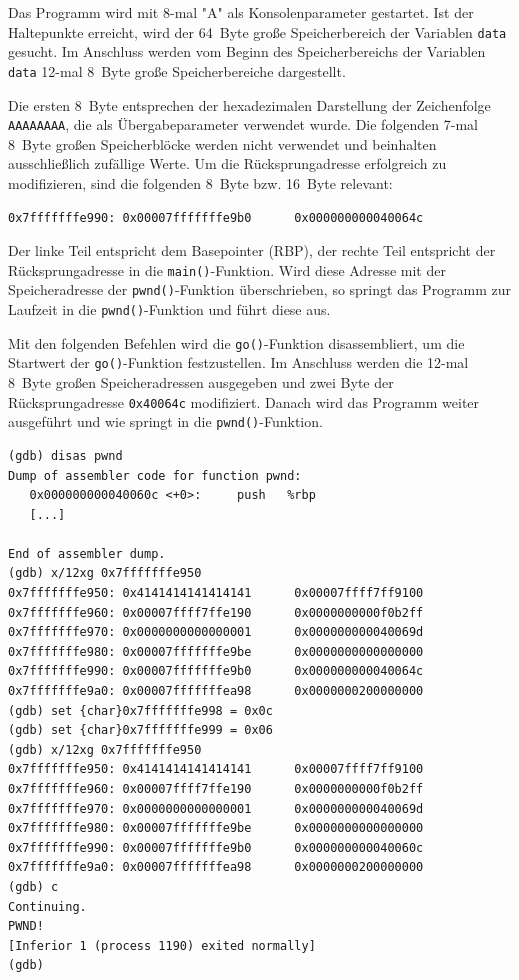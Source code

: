 Das Programm wird mit 8-mal "A" als Konsolenparameter gestartet. Ist der Haltepunkte erreicht, wird der \SI{64}{Byte} große Speicherbereich der Variablen \texttt{data} gesucht. Im Anschluss werden vom Beginn des Speicherbereichs der Variablen \texttt{data} 12-mal \SI{8}{Byte} große Speicherbereiche dargestellt. 

Die ersten \SI{8}{Byte} entsprechen der hexadezimalen Darstellung der Zeichenfolge \texttt{AAAAAAAA}, die als Übergabeparameter verwendet wurde. Die folgenden 7-mal \SI{8}{Byte} großen Speicherblöcke werden nicht verwendet und beinhalten ausschließlich zufällige Werte. Um die Rücksprungadresse erfolgreich zu modifizieren, sind die folgenden \SI{8}{Byte} bzw. \SI{16}{Byte} relevant:

\begin{lstlisting}[basicstyle=\ttfamily\footnotesize]
0x7fffffffe990: 0x00007fffffffe9b0      0x000000000040064c
\end{lstlisting}

Der linke Teil entspricht dem Basepointer (RBP), der rechte Teil entspricht der Rücksprungadresse in die \texttt{main()}-Funktion. Wird diese Adresse mit der Speicheradresse der \texttt{pwnd()}-Funktion überschrieben, so springt das Programm zur Laufzeit in die \texttt{pwnd()}-Funktion und führt diese aus.
 
Mit den folgenden Befehlen wird die \texttt{go()}-Funktion disassembliert, um die Startwert der \texttt{go()}-Funktion festzustellen. Im Anschluss werden die 12-mal \SI{8}{Byte} großen Speicheradressen ausgegeben und zwei Byte der Rücksprungadresse \texttt{0x40064c} modifiziert. Danach wird das Programm weiter ausgeführt und wie springt in die \texttt{pwnd()}-Funktion.

\begin{lstlisting}[basicstyle=\ttfamily\footnotesize]
(gdb) disas pwnd
Dump of assembler code for function pwnd:
   0x000000000040060c <+0>:     push   %rbp
   [...]	

End of assembler dump.
(gdb) x/12xg 0x7fffffffe950
0x7fffffffe950: 0x4141414141414141      0x00007ffff7ff9100
0x7fffffffe960: 0x00007ffff7ffe190      0x0000000000f0b2ff
0x7fffffffe970: 0x0000000000000001      0x000000000040069d
0x7fffffffe980: 0x00007fffffffe9be      0x0000000000000000
0x7fffffffe990: 0x00007fffffffe9b0      0x000000000040064c
0x7fffffffe9a0: 0x00007fffffffea98      0x0000000200000000
(gdb) set {char}0x7fffffffe998 = 0x0c
(gdb) set {char}0x7fffffffe999 = 0x06
(gdb) x/12xg 0x7fffffffe950
0x7fffffffe950: 0x4141414141414141      0x00007ffff7ff9100
0x7fffffffe960: 0x00007ffff7ffe190      0x0000000000f0b2ff
0x7fffffffe970: 0x0000000000000001      0x000000000040069d
0x7fffffffe980: 0x00007fffffffe9be      0x0000000000000000
0x7fffffffe990: 0x00007fffffffe9b0      0x000000000040060c
0x7fffffffe9a0: 0x00007fffffffea98      0x0000000200000000
(gdb) c
Continuing.
PWND!
[Inferior 1 (process 1190) exited normally]
(gdb)
\end{lstlisting}

